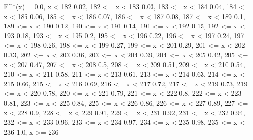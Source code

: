 F^*(x) = 
    0.0, x < 182
    0.02,  182 <= x < 183 
    0.03,  183 <= x < 184 
    0.04,  184 <= x < 185 
    0.06,  185 <= x < 186 
    0.07,  186 <= x < 187 
    0.08,  187 <= x < 189 
    0.1,  189 <= x < 190 
    0.12,  190 <= x < 191 
    0.14,  191 <= x < 192 
    0.15,  192 <= x < 193 
    0.18,  193 <= x < 195 
    0.2,  195 <= x < 196 
    0.22,  196 <= x < 197 
    0.24,  197 <= x < 198 
    0.26,  198 <= x < 199 
    0.27,  199 <= x < 201 
    0.29,  201 <= x < 202 
    0.33,  202 <= x < 203 
    0.36,  203 <= x < 204 
    0.39,  204 <= x < 205 
    0.42,  205 <= x < 207 
    0.47,  207 <= x < 208 
    0.5,  208 <= x < 209 
    0.51,  209 <= x < 210 
    0.54,  210 <= x < 211 
    0.58,  211 <= x < 213 
    0.61,  213 <= x < 214 
    0.63,  214 <= x < 215 
    0.66,  215 <= x < 216 
    0.69,  216 <= x < 217 
    0.72,  217 <= x < 219 
    0.73,  219 <= x < 220 
    0.78,  220 <= x < 221 
    0.79,  221 <= x < 222 
    0.8,  222 <= x < 223 
    0.81,  223 <= x < 225 
    0.84,  225 <= x < 226 
    0.86,  226 <= x < 227 
    0.89,  227 <= x < 228 
    0.9,  228 <= x < 229 
    0.91,  229 <= x < 231 
    0.92,  231 <= x < 232 
    0.94,  232 <= x < 233 
    0.96,  233 <= x < 234 
    0.97,  234 <= x < 235 
    0.98,  235 <= x < 236 
    1.0, x >= 236 
